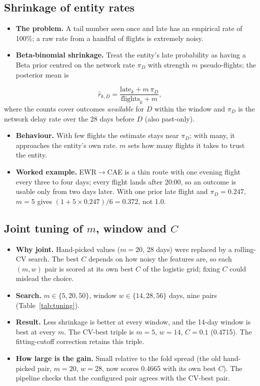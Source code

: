 \documentclass[conference]{IEEEtran}
\begin{document}
\subsection{Shrinkage of entity rates}
\begin{itemize}
\item \textbf{The problem.} A tail number seen once and late has an empirical rate of 100\%; a raw rate from a handful of flights is extremely noisy.
\item \textbf{Beta-binomial shrinkage.} Treat the entity's late probability as having a Beta prior centred on the network rate $\pi_D$ with strength $m$ pseudo-flights; the posterior mean is
\end{itemize}
\[
\hat r_{k,D}=\frac{\text{late}_k+m\,\pi_D}{\text{flights}_k+m},
\]
where the counts cover outcomes \emph{available} for $D$ within the window and $\pi_D$ is the network delay rate over the 28 days before $D$ (also past-only).
\begin{itemize}
\item \textbf{Behaviour.} With few flights the estimate stays near $\pi_D$; with many, it approaches the entity's own rate. $m$ sets how many flights it takes to trust the entity.
\item \textbf{Worked example.} EWR$\to$CAE is a thin route with one evening flight every three to four days; every flight lands after 20:00, so an outcome is usable only from two days later. With one prior late flight and $\pi_D=0.247$, $m=5$ gives $(1+5\times0.247)/6=0.372$, not 1.0.
\end{itemize}

\subsection{Joint tuning of $m$, window and $C$}
\begin{itemize}
\item \textbf{Why joint.} Hand-picked values ($m=20$, 28 days) were replaced by a rolling-CV search. The best $C$ depends on how noisy the features are, so each $(m,w)$ pair is scored at its own best $C$ of the logistic grid; fixing $C$ could mislead the choice.
\item \textbf{Search.} $m\in\{5,20,50\}$, window $w\in\{14,28,56\}$ days, nine pairs (Table~\ref{tab:tuning}).
\item \textbf{Result.} Less shrinkage is better at every window, and the 14-day window is best at every $m$. The CV-best triple is $m=5$, $w=14$, $C=0.1$ (0.4715). The fitting-cutoff correction retains this triple.
\item \textbf{How large is the gain.} Small relative to the fold spread (the old hand-picked pair, $m=20$, $w=28$, now scores 0.4665 with its own best $C$). The pipeline checks that the configured pair agrees with the CV-best pair.
\end{itemize}
\end{document}
